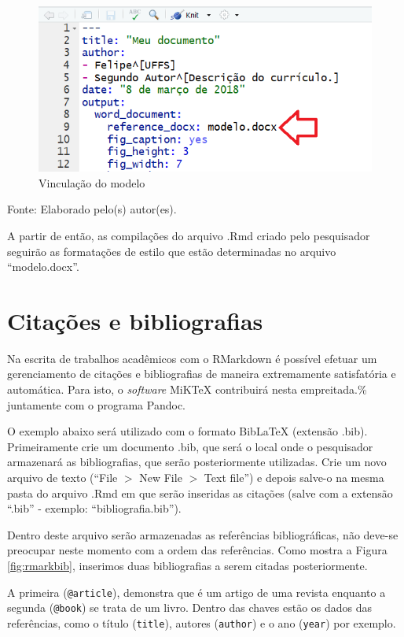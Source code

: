 \documentclass[12pt,portuguese,oneside]{book}
\begin{document}
\begin{figure}[H]

{\centering \includegraphics[width=0.8\linewidth]{rmarkestilos2} 

}

\caption{Vinculação do modelo}\label{fig:rmarkestilos2}
\end{figure}

Fonte: Elaborado pelo(s) autor(es).

A partir de então, as compilações do arquivo .Rmd criado pelo
pesquisador seguirão as formatações de estilo que estão determinadas no
arquivo ``modelo.docx''.

\section{Citações e bibliografias}\label{citacoes-e-bibliografias}

Na escrita de trabalhos acadêmicos com o RMarkdown é possível efetuar um
gerenciamento de citações e bibliografias de maneira extremamente
satisfatória e automática. Para isto, o \emph{software} MiKTeX
contribuirá nesta empreitada.\% juntamente com o programa Pandoc.

O exemplo abaixo será utilizado com o formato BibLaTeX (extensão .bib).
Primeiramente crie um documento .bib, que será o local onde o
pesquisador armazenará as bibliografias, que serão posteriormente
utilizadas. Crie um novo arquivo de texto (``File \(>\) New File \(>\)
Text file'') e depois salve-o na mesma pasta do arquivo .Rmd em que
serão inseridas as citações (salve com a extensão ``.bib'' - exemplo:
``bibliografia.bib'').

Dentro deste arquivo serão armazenadas as referências bibliográficas,
não deve-se preocupar neste momento com a ordem das referências. Como
mostra a Figura \ref{fig:rmarkbib}, inserimos duas bibliografias a serem
citadas posteriormente.

A primeira (\texttt{@article}), demonstra que é um artigo de uma revista
enquanto a segunda (\texttt{@book}) se trata de um livro. Dentro das
chaves estão os dados das referências, como o título (\texttt{title}),
autores (\texttt{author}) e o ano (\texttt{year}) por exemplo.
\end{document}
